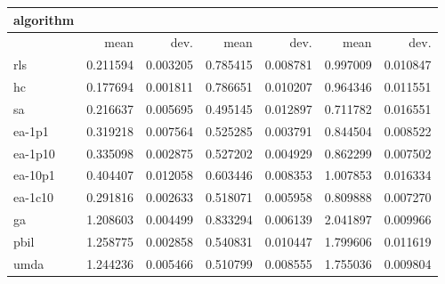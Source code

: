 \begin{tabular}{@{}l*{6}{>{{}}N{1}{2}}@{}}
\toprule
{algorithm} &  &  &  \\
\midrule
& {mean} & {dev.} & {mean} & {dev.} & {mean} & {dev.} \\
\midrule
rls & 0.211594 & 0.003205 & 0.785415 & 0.008781 & 0.997009 & 0.010847 \\
 hc & 0.177694 & 0.001811 & 0.786651 & 0.010207 & 0.964346 & 0.011551 \\
 sa & 0.216637 & 0.005695 & 0.495145 & 0.012897 & 0.711782 & 0.016551 \\
 ea-1p1 & 0.319218 & 0.007564 & 0.525285 & 0.003791 & 0.844504 & 0.008522 \\
 ea-1p10 & 0.335098 & 0.002875 & 0.527202 & 0.004929 & 0.862299 & 0.007502 \\
 ea-10p1 & 0.404407 & 0.012058 & 0.603446 & 0.008353 & 1.007853 & 0.016334 \\
 ea-1c10 & 0.291816 & 0.002633 & 0.518071 & 0.005958 & 0.809888 & 0.007270 \\
 ga & 1.208603 & 0.004499 & 0.833294 & 0.006139 & 2.041897 & 0.009966 \\
 pbil & 1.258775 & 0.002858 & 0.540831 & 0.010447 & 1.799606 & 0.011619 \\
 umda & 1.244236 & 0.005466 & 0.510799 & 0.008555 & 1.755036 & 0.009804 \\
 \bottomrule
\end{tabular}
